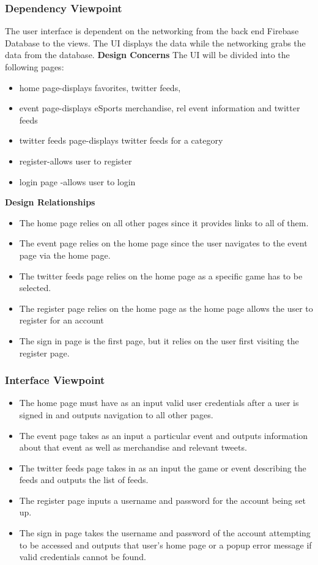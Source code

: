 \documentclass[onecolumn, draftclsnofoot,10pt, compsoc]{IEEEtran}
\begin{document}
        \subsubsection{Dependency Viewpoint}
        The user interface is dependent on the networking from the back end Firebase Database to the views. The UI displays the data while the networking grabs the data from the database.
        \textbf{Design Concerns}
        The UI will be divided into the following pages:
       \begin{itemize}
       \item home page-displays favorites, twitter feeds, 
       \item event page-displays eSports merchandise, rel event information and twitter feeds 
       \item twitter feeds page-displays twitter feeds for a category
       \item register-allows user to register
       \item login page -allows user to login 
       \end{itemize}
       \textbf{Design Relationships}
       \begin{itemize} 
       \item The home page relies on all other pages since it provides links to all of them. 
       \item The event page relies on the home page since the user navigates to the event page via the home page. 
       \item The twitter feeds page relies on the home page as a specific game has to be selected.
       \item The register page relies on the home page as the home page allows the user to register for an account 
       \item The sign in page is the first page, but it relies on the user first visiting the register page.
       \end{itemize}
   \subsubsection{Interface Viewpoint}
          \begin {itemize}
          \item The home page must have as an input valid user credentials after a user is signed in and outputs navigation to all other pages.
          \item The event page takes as an input a particular event and outputs information about that event as well as merchandise and relevant tweets.
          \item The twitter feeds page takes in as an input the game or event describing the feeds and outputs the list of feeds. 
          \item The register page inputs a username and password for the account being set up.
          \item The sign in page takes the username and password of the account attempting to be accessed and outputs that user's home page or a popup error message if valid credentials cannot be found.
          \end {itemize} 
          
\end{document}
